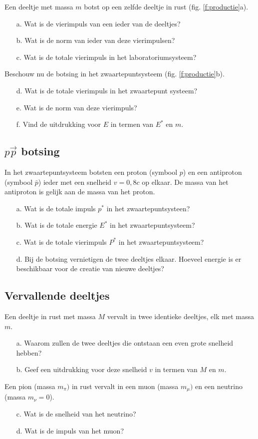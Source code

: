 Een deeltje met massa $m$ botst op een zelfde deeltje in 
rust (fig. \ref{f:productie}a).
\begin{itemize}
\item [a.]
Wat is de vierimpuls van een ieder van de deeltjes?
\item [b.]
Wat is de norm van ieder van deze vierimpulsen?
\item [c.]
Wat is de totale vierimpuls in het laboratoriumsysteem?
\end{itemize}
Beschouw nu de botsing in het zwaartepuntsysteem (fig. \ref{f:productie}b).
\begin{itemize}
\item [d.]
Wat is de totale vierimpuls in het zwaartepunt systeem?
\item [e.]
Wat is de norm van deze vierimpuls?
\item [f.]
Vind de uitdrukking voor $E$ in termen van $E^{*}$ en $m$.
\end{itemize}

\subsection{$p\vec{p}$ botsing}
In het zwaartepuntsysteem botsten een
proton (symbool $p$) en een antiproton (symbool $\bar{p}$) ieder met een
snelheid $v= 0,8c$ op elkaar.
De massa van het antiproton is gelijk aan de massa van het proton.
\begin{itemize}
\item [a.]
Wat is de totale impuls $p^{*}$ in het zwaartepuntsysteen?
\item [b.]
Wat is de totale energie $E^{*}$ in het zwaartepuntsysteem?
\item [c.]
Wat is de totale vierimpuls $P^{*}$ in het zwaartepuntsysteem?
\item [d.]
Bij de botsing vernietigen de twee deeltjes elkaar.
Hoeveel energie is er beschikbaar voor de creatie van nieuwe
deeltjes?
\end{itemize}

\subsection{Vervallende deeltjes}
Een deeltje in rust met massa $M$ vervalt in twee identieke deeltjes, elk 
met massa $m$.
\begin{itemize}
\item [a.]
Waarom zullen de twee deeltjes die ontstaan een even grote snelheid hebben?
\item [b.]
Geef een uitdrukking voor deze snelheid $v$ in termen van
$M$ en $m$.
\end{itemize}
Een pion (massa $m_{\pi})$ in rust vervalt in een muon (massa $m_{\mu})$ en een
neutrino (massa $m_{\nu} = 0$).
\begin{itemize}
\item [c.]
Wat is de snelheid van het neutrino?
\item [d.]
Wat is de impuls van het muon?
\end{itemize}

